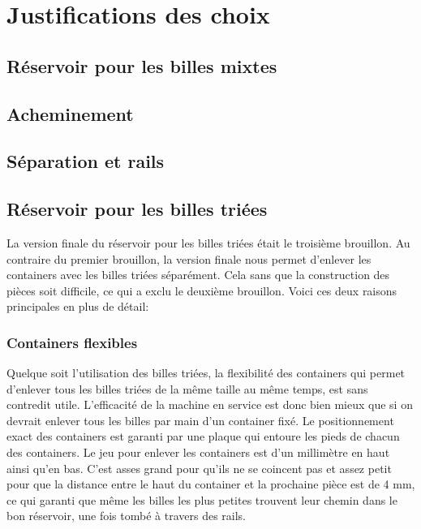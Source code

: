 \chapter{Justifications des choix}

\section{Réservoir pour les billes mixtes}

\section{Acheminement}

\section{Séparation et rails}

\section{Réservoir pour les billes triées}
La version finale du réservoir pour les billes triées était le troisième brouillon. Au contraire du premier brouillon, la version finale nous permet d'enlever les containers avec les billes triées séparément. Cela sans que la construction des pièces soit difficile, ce qui a exclu le deuxième brouillon. Voici ces deux raisons principales en plus de détail:

\subsection{Containers flexibles}
Quelque soit l'utilisation des billes triées, la flexibilité des containers qui permet d'enlever tous les billes triées de la même taille au même temps, est sans contredit utile. L'efficacité de la machine en service est donc bien mieux que si on devrait enlever tous les billes par main d'un container fixé. Le positionnement exact des containers est garanti par une plaque %
qui entoure les pieds de chacun des containers. Le jeu pour enlever les containers est d'un millimètre en haut ainsi qu'en bas. C'est asses grand pour qu'ils ne se coincent pas et assez petit pour que la distance entre le haut du container et la prochaine pièce est de 4 mm, ce qui garanti que même les billes les plus petites trouvent leur chemin dans le bon réservoir, une fois tombé à travers des rails.

